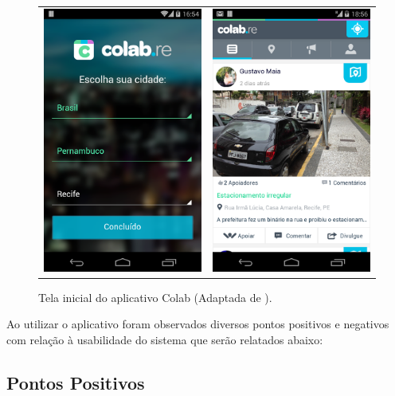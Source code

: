\begin{figure}[!h]
\centering
    \begin{tabular}{cc}
     \includegraphics[width=.40\textwidth]{figuras/colab_start.png}  &   \includegraphics[width=.40\textwidth]{figuras/tela-inicial-colab-re.png} 
    \end{tabular}
    \caption{Tela inicial do aplicativo Colab (Adaptada de \cite{colab}).}
    \label{colab-app}
\end{figure}

Ao utilizar o aplicativo foram observados diversos pontos positivos e negativos com relação à usabilidade do sistema que serão relatados abaixo:

\subsection*{Pontos Positivos}

